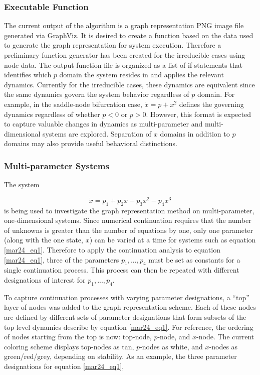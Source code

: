 \documentclass[12pt]{article}
\begin{document}
\subsubsection{Executable Function}
The current output of the algorithm is a graph representation PNG image file generated via GraphViz. It is desired to create a function based on the data used to generate the graph representation for system execution. Therefore a preliminary function generator has been created for the irreducible cases using node data. The output function file is organized as a list of if-statements that identifies which $p$ domain the system resides in and applies the relevant dynamics. Currently for the irreducible cases, these dynamics are equivalent since the same dynamics govern the system behavior regardless of $p$ domain. For example, in the saddle-node bifurcation case, $\dot{x}=p+x^2$ defines the governing dynamics regardless of whether $p<0$ or $p>0$. However, this format is expected to capture valuable changes in dynamics as multi-parameter and multi-dimensional systems are explored. Separation of $x$ domains in addition to $p$ domains may also provide useful behavioral distinctions.


\subsubsection{Multi-parameter Systems}
The system

\begin{equation}
\label{mar24_eq1}
\dot{x}=p_1+p_2x+p_3x^2-p_4x^3
\end{equation}
is being used to investigate the graph representation method on multi-parameter, one-dimensional systems. Since numerical continuation requires that the number of unknowns is greater than the number of equations by one, only one parameter (along with the one state, $x$) can be varied at a time for systems such as equation \ref{mar24_eq1}. Therefore to apply the continuation analysis to equation \ref{mar24_eq1}, three of the parameters $p_1,...,p_4$ must be set as constants for a single continuation process. This process can then be repeated with different designations of interest for $p_1,...,p_4$. 

To capture continuation processes with varying parameter designations, a ``top'' layer of nodes was added to the graph representation scheme. Each of these nodes are defined by different sets of parameter designations that form subsets of the top level dynamics describe by equation \ref{mar24_eq1}. For reference, the ordering of nodes starting from the top is now: top-node, $p$-node, and $x$-node. The current coloring scheme displays top-nodes as tan, $p$-nodes as white, and $x$-nodes as green/red/grey, depending on stability. As an example, the three parameter designations for equation \ref{mar24_eq1},
\end{document}
